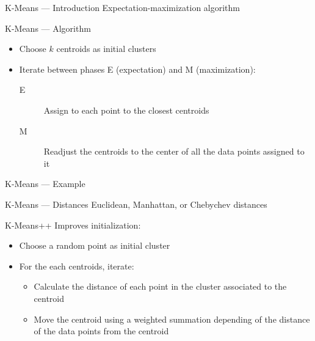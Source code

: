 \begin{frame}{K-Means --- Introduction}
  Expectation-maximization algorithm
\end{frame}

\begin{frame}{K-Means --- Algorithm}
  \begin{itemize}
    \item Choose $k$ centroids as initial clusters
    \item Iterate between phases E (expectation) and M (maximization):
      \begin{description}
        \item[E] Assign to each point to the closest centroids
        \item[M] Readjust the centroids to the center of all the data points assigned to it
      \end{description}
  \end{itemize}  
\end{frame}

\begin{frame}{K-Means --- Example}
\end{frame}

\begin{frame}{K-Means --- Distances}
  Euclidean, Manhattan, or Chebychev distances
\end{frame}

\begin{frame}{K-Means++}
  Improves initialization:

  \begin{itemize}
    \item Choose a random point as initial cluster
    \item For the each centroids, iterate:
      \begin{itemize}
        \item Calculate the distance of each point in the cluster associated to the centroid
        \item Move the centroid using a weighted summation depending of the distance of the data points from the centroid
      \end{itemize}
  \end{itemize}

\end{frame}

